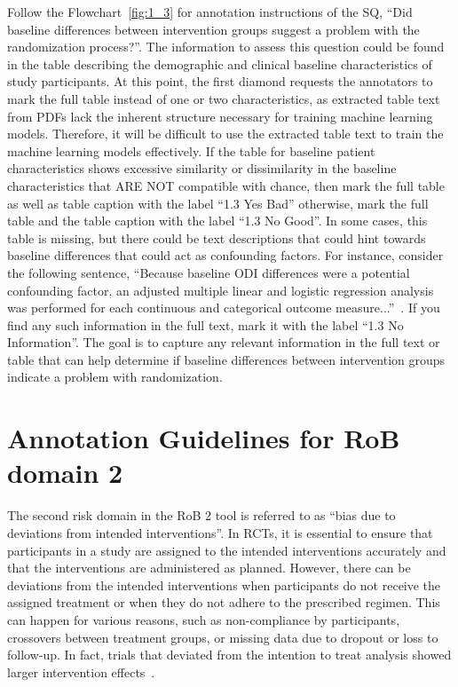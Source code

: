 \documentclass[sn-mathphys,Numbered]{sn-jnl}%
\begin{document}
Follow the Flowchart~\ref{fig:1_3} for annotation instructions of the SQ, ``Did baseline differences between intervention groups suggest a problem with the randomization process?''.
The information to assess this question could be found in the table describing the demographic and clinical baseline characteristics of study participants. 
At this point, the first diamond requests the annotators to mark the full table instead of one or two characteristics, as extracted table text from PDFs lack the inherent structure necessary for training machine learning models.
Therefore, it will be difficult to use the extracted table text to train the machine learning models effectively. 
If the table for baseline patient characteristics shows excessive similarity or dissimilarity in the baseline characteristics that ARE NOT compatible with chance, then mark the full table as well as table caption with the label ``1.3 Yes Bad'' otherwise, mark the full table and the table caption with the label ``1.3 No Good''.
In some cases, this table is missing, but there could be text descriptions that could hint towards baseline differences that could act as confounding factors.
For instance, consider the following sentence, ``Because baseline ODI differences were a potential confounding factor, an adjusted multiple linear and logistic regression analysis was performed for each continuous and categorical outcome measure...''~\citep{cohen2008randomized}.
If you find any such information in the full text, mark it with the label ``1.3 No Information''.
The goal is to capture any relevant information in the full text or table that can help determine if baseline differences between intervention groups indicate a problem with randomization.
%
%
%
\section*{Annotation Guidelines for RoB domain 2}
\label{sec:dom2}
%
The second risk domain in the RoB 2 tool is referred to as ``bias due to deviations from intended interventions''.
In RCTs, it is essential to ensure that participants in a study are assigned to the intended interventions accurately and that the interventions are administered as planned.
However, there can be deviations from the intended interventions when participants do not receive the assigned treatment or when they do not adhere to the prescribed regimen.
This can happen for various reasons, such as non-compliance by participants, crossovers between treatment groups, or missing data due to dropout or loss to follow-up.
In fact, trials that deviated from the intention to treat analysis showed larger intervention effects~\cite{abraha2015deviation}.
\end{document}
